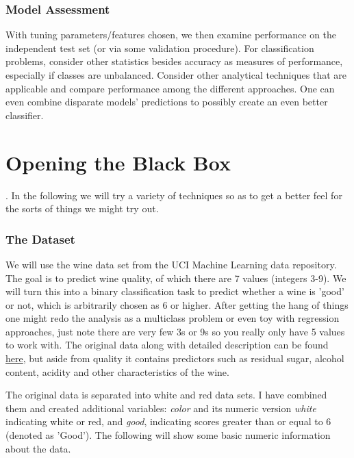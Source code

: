 \documentclass[english,nohyper,titlepage]{tufte-handout}\usepackage{knitr}
\begin{document}
\section{Model Assessment}
With tuning parameters/features chosen, we then examine performance on the independent test set (or via some validation procedure). For classification problems, consider other statistics besides accuracy as measures of performance, especially if classes are unbalanced. Consider other analytical techniques that are applicable and compare performance among the different approaches.  One can even combine disparate models' predictions to possibly create an even better classifier.








\part{Opening the Black Box}

.  In the following we will try a variety of techniques so as to get a better feel for the sorts of things we might try out.

\section{The Dataset}
We will use the wine data set from the UCI Machine Learning data repository.  The goal is to predict wine quality, of which there are 7 values (integers 3-9).  We will turn this into a binary classification task to predict whether a wine is 'good' or not, which is arbitrarily chosen as 6 or higher.  After getting the hang of things one might redo the analysis as a multiclass problem or even toy with regression approaches, just note there are very few 3s or 9s so you really only have 5 values to work with.  The original data along with detailed description can be found \href{http://archive.ics.uci.edu/ml/datasets/Wine+Quality}{here}, but aside from quality it contains predictors such as residual sugar, alcohol content, acidity and other characteristics of the wine.

The original data is separated into white and red data sets. I have combined them and created additional variables: \emph{color} and its numeric version \emph{white} indicating white or red, and \emph{good}, indicating scores greater than or equal to 6 (denoted as 'Good').  The following will show some basic numeric information about the data.
\end{document}

